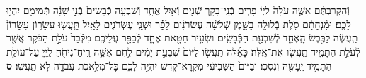 \documentclass[twoside, openany, parskip=half, 11pt]{book}
\begin{document}
\begin{footnotesize}
\begin{multicols}{2}
\\
\\
וְֿהִקְרַבְתֶּ֨ם אִשֶּׁ֤ה עֹלָה֙ לַֽיְיָ֔ פָּרִ֧ים בְּֿנֵֽי־בָקָ֛ר שְֿׁנַ֖יִם וְֿאַ֣יִל אֶחָ֑ד וְֿשִׁבְעָ֤ה כְֿבָשִׂים֙ בְּֿנֵ֣י שָׁנָ֔ה תְּֿמִימִ֖ם יִהְי֥וּ לָכֶֽם׃ וּמִ֨נְחָתָ֔ם סֹ֖לֶת בְּֿלוּלָ֣ה בַשָּׁ֑מֶן שְֿׁלֹשָׁ֨ה עֶשְׂרֹנִ֜ים לַפָּ֗ר וּשְׁנֵ֧י עֶשְׂרֹנִ֛ים לָאַ֖יִל תַּֽעֲשֽׂוּ׃ עִשָּׂר֤וֹן עִשָּׂרוֹן֙ תַּֽעֲשֶׂ֔ה לַכֶּ֖בֶשׂ הָֽאֶחָ֑ד לְֿשִׁבְעַ֖ת הַכְּֿבָשִֽׂים׃ וּשְׂעִ֥יר חַטָּ֖את אֶחָ֑ד לְֿכַפֵּ֖ר עֲלֵיכֶֽם׃ מִלְּֿבַד֙ עֹלַ֣ת הַבֹּ֔קֶר אֲשֶׁ֖ר לְֿעֹלַ֣ת הַתָּמִ֑יד תַּֽעֲשׂ֖וּ אֶת־אֵֽלֶּה׃ כָּאֵ֜לֶּה תַּֽעֲשׂ֤וּ לַיּוֹם֙ שִׁבְעַ֣ת יָמִ֔ים לֶ֛חֶם אִשֵּׁ֥ה רֵֽיחַ־נִיחֹ֖חַ לַֽיְיָ֑ עַל־עוֹלַ֧ת הַתָּמִ֛יד יֵֽעָשֶׂ֖ה וְֿנִסְכּֽוֹ׃ וּבַיּוֹם֙ הַשְּֿׁבִיעִ֔י מִקְרָא־קֹ֖דֶשׁ יִהְיֶ֣ה לָכֶ֑ם כׇּל־מְֿלֶ֥אכֶת עֲבֹדָ֖ה לֹ֥א תַֽעֲשֽׂוּ׃ \textbf{ס}


\end{multicols}
\end{footnotesize}
\end{document}
